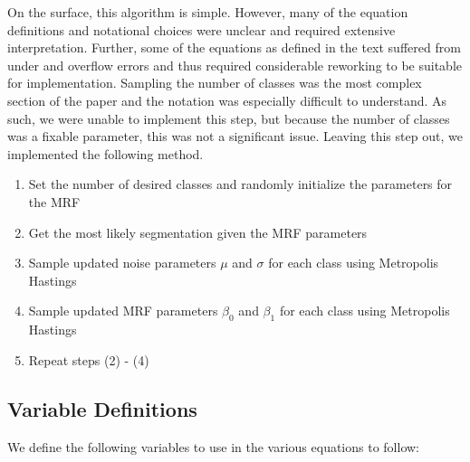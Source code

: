 \documentclass[11pt]{article}
\begin{document}
On the surface, this algorithm is simple. However, many of the equation definitions and notational choices were unclear and required extensive interpretation. 
Further, some of the equations as defined in the text suffered from under and overflow errors and thus required considerable reworking to be suitable for implementation. 
Sampling the number of classes was the most complex section of the paper and the notation was especially difficult to understand.
As such, we were unable to implement this step, but because the number of classes was a fixable parameter, this was not a significant issue.
Leaving this step out, we implemented the following method.
\begin{enumerate}
	\item Set the number of desired classes and randomly initialize the parameters for the MRF
	\item Get the most likely segmentation given the MRF parameters
	\item Sample updated noise parameters $\mu$ and $\sigma$ for each class using Metropolis Hastings
	\item Sample updated MRF parameters $\beta_0$ and $\beta_1$ for each class using Metropolis Hastings
	\item Repeat steps (2) - (4)
\end{enumerate}

\subsection{Variable Definitions}
We define the following variables to use in the various equations to follow:
\end{document}
